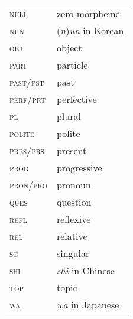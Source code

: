\begin{multicols}{2}
\begin{tabular}{lp{4.5cm}}
\textsc{null}  & zero morpheme \\ 
\textsc{nun} & (\textit{n})\textit{un} in Korean \\ 
\textsc{obj} & object \\ 
\textsc{part} & particle \\ 
\textsc{past}/\textsc{pst} & past \\ 
\textsc{perf}/\textsc{prt} & perfective \\ 
\textsc{pl} & plural \\ 
\textsc{polite} & polite \\ 
\textsc{pres}/\textsc{prs} & present \\ 
\textsc{prog} & progressive \\ 
\textsc{pron}/\textsc{pro} & pronoun \\
\textsc{ques} & question \\ 
\textsc{refl} & reflexive \\ 
\textsc{rel} & relative \\ 
\textsc{sg} & singular \\ 
\textsc{shi} & \textit{sh\`{i}} in Chinese \\ 
\textsc{top} & topic \\ 
\textsc{wa} & \textit{wa} in Japanese \\
\end{tabular}

 
\end{multicols} 
